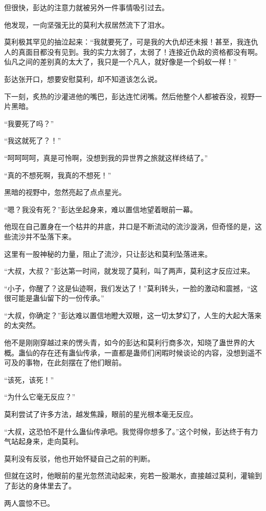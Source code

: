 \begin{this_body}
但很快，彭达的注意力就被另外一件事情吸引过去。

他发现，一向坚强无比的莫利大叔居然流下了泪水。

莫利极其罕见的抽泣起来：“我就要死了，可是我的大仇却还未报！甚至，我连仇人的真面目都没有见到。我的实力太弱了，太弱了！连接近仇敌的资格都没有啊。仙凡之间的差别真的太大了，我只是一个凡人，就好像是一个蚂蚁一样！”

彭达张开口，想要安慰莫利，却不知道该怎么说。

下一刻，炙热的沙灌进他的嘴巴，彭达连忙闭嘴。然后他整个人都被吞没，视野一片黑暗。

“我要死了吗？”

“我这就死了？！”

“呵呵呵呵，真是可怜啊，没想到我的异世界之旅就这样终结了。”

“真的不想死啊，我真的不想死！”

黑暗的视野中，忽然亮起了点点星光。

“嗯？我没有死？”彭达坐起身来，难以置信地望着眼前一幕。

他现在自己置身在一个枯井的井底，井口是不断流动的流沙漩涡，但奇怪的是，这些流沙并不坠落下来。

这里有一股神秘的力量，阻止了流沙，只让彭达和莫利坠落进来。

“大叔，大叔？”彭达第一时间，就发现了莫利，叫了两声，莫利这才反应过来。

“小子，你醒了？这是仙迹啊，我们发达了！”莫利转头，一脸的激动和震撼，“这很可能是蛊仙留下的一份传承。”

“大叔，你确定？”彭达难以置信地瞪大双眼，这一切太梦幻了，人生的大起大落来的太突然。

他不是刚刚穿越过来的愣头青，如今的彭达和莫利行商多次，知晓了蛊世界的大概。蛊仙的存在还有蛊仙传承，一直都是蛊师们闲暇时候谈论的内容，没想到遥不可及的事物，在此刻摆在了他们眼前。

“该死，该死！”

“为什么它毫无反应？”

莫利尝试了许多方法，越发焦躁，眼前的星光根本毫无反应。

“大叔，这恐怕不是什么蛊仙传承吧。我觉得你想多了。”这个时候，彭达终于有力气站起身来，走向莫利。

莫利没有反驳，他也开始怀疑自己之前的判断。

但就在这时，他眼前的星光忽然流动起来，宛若一股潮水，直接越过莫利，灌输到了彭达的身体里去了。

两人震惊不已。


\end{this_body}
